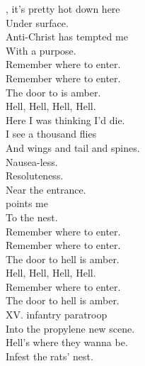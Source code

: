 



, it's pretty hot down here \\
Under surface. \\
Anti-Christ has tempted me \\
With a purpose. \\

Remember where to enter. \\
Remember where to enter. \\
The door to  is amber. \\

Hell, Hell, Hell, Hell. \\

Here I was thinking I'd die. \\
I see a thousand flies \\
And wings and tail and spines. \\
Nausea-less. \\
Resoluteness. \\
Near the entrance. \\
 points me \\
To the  nest. \\

Remember where to enter.\\
 Remember where to enter. \\
The door to hell is amber. \\

Hell, Hell, Hell, Hell. \\

Remember where to enter. \\
The door to hell is amber. \\

XV. infantry paratroop \\
Into the propylene new scene. \\
Hell's where they wanna be. \\
Infest the rats' nest. \\
